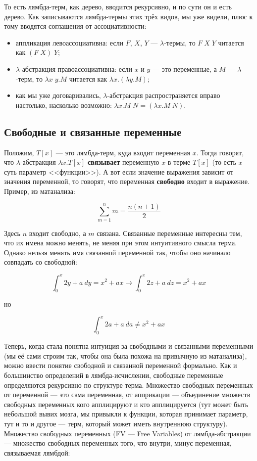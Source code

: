 \documentclass[a5paper]{article}
\begin{document}
То есть лямбда-терм, как дерево, вводится рекурсивно, и по сути он и есть дерево. Как записываются лямбда-термы этих трёх видов, мы уже видели, плюс к тому вводятся соглашения от ассоциативности:

\begin{itemize}
    \item аппликация левоассоциативна: если $F$, $X$, $Y$ --- $\lambda$-термы, то $F \; X \; Y$ читается как $(F \; X) \; Y$;
    \item $\lambda$-абстракция правоассоциативна: если $x$ и $y$ --- это переменные, а $M$ --- $\lambda$-терм, то $\lambda x \; y.M$ читается как $\lambda x.(\lambda y.M)$;
    \item как мы уже договаривались, $\lambda$-абстракция распространяется вправо настолько, насколько возможно: $\lambda x.M \; N = (\lambda x.M \; N)$.
\end{itemize}

\subsection{Свободные и связанные переменные}

Положим, $T[x]$ --- это лямбда-терм, куда входит переменная $x$. Тогда говорят, что $\lambda$-абстракция $\lambda x.T[x]$ \textbf{связывает} переменную $x$ в терме $T[x]$ (то есть $x$ суть параметр <<функции>>). А вот если значение выражения зависит от значения переменной, то говорят, что переменная \textbf{свободно} входит в выражение. Пример, из матанализа:

$$\sum_{m = 1}^{n} m = \frac{n(n + 1)}{2}$$

Здесь $n$ входит свободно, а $m$ связана. Связанные переменные интересны тем, что их имена можно менять, не меняя при этом интуитивного смысла терма. Однако нельзя менять имя связанной переменной так, чтобы оно начинало совпадать со свободной:

$$\int_{0}^{x}2y + a\ dy = x^2 + ax \longrightarrow \int_{0}^{x}2z + a\ dz = x^2 + ax$$

но

$$\int_{0}^{x}2a + a\ da \neq x^2 + ax$$

Теперь, когда стала понятна интуиция за свободными и связанными переменными (мы её сами строим так, чтобы она была похожа на привычную из матанализа), можно ввести понятие свободной и связанной переменной формально. Как и большинство определений в лямбда-исчислении, свободные переменные определяются рекурсивно по структуре терма. Множество свободных переменных от переменной --- это сама переменная, от апприкации --- объединение множеств свободных переменных кого апплицируют и кто апплицируется (тут может быть небольшой вывих мозга, мы привыкли к функции, которая принимает параметр, тут и то и другое --- терм, который может иметь внутреннюю структуру). Множество свободных переменных (FV --- Free Variables) от лямбда-абстракции --- множество свободных переменных того, что внутри, минус переменная, связываемая лямбдой:
\end{document}
